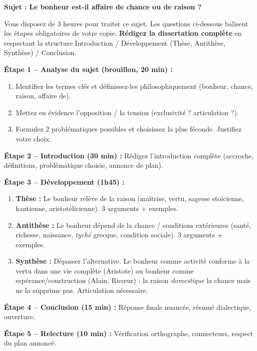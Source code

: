 \documentclass[11pt]{article}
\newcommand{\cle}[1]{{\popxbold\color{popdark}#1}}
\newcounter{popsec}
\newcounter{popsub}
\newcommand{\courssub}[1]{%
  \stepcounter{popsub}%
  \par\vspace{9pt}\noindent{\popxbold\fontsize{11.5}{13}\selectfont\color{popink}{\color{poporange}\thepopsec.\thepopsub}\hspace{6pt}#1}\par\nopagebreak\vspace{4pt}
}
\begin{document}
\courssub{Je me prépare au Bac}

\begin{exercice}
\textbf{Sujet :} \og \textbf{Le bonheur est-il affaire de chance ou de raison ?} \fg{}

Vous disposez de 3 heures pour traiter ce sujet. Les questions ci-dessous balisent les étapes obligatoires de votre copie. \textbf{Rédigez la dissertation complète} en respectant la structure Introduction / Développement (Thèse, Antithèse, Synthèse) / Conclusion.

\textbf{Étape 1 -- Analyse du sujet (brouillon, 20 min) :}
\begin{enumerate}
\item Identifiez les termes clés et définissez-les philosophiquement (bonheur, chance, raison, affaire de).
\item Mettez en évidence l'opposition / la tension (exclusivité ? articulation ?).
\item Formulez 2 problématiques possibles et choisissez la plus féconde. Justifiez votre choix.
\end{enumerate}

\textbf{Étape 2 -- Introduction (30 min) :}
Rédigez l'introduction complète (accroche, définitions, problématique choisie, annonce de plan).

\textbf{Étape 3 -- Développement (1h45) :}
\begin{enumerate}
\item \textbf{Thèse :} Le bonheur relève de la raison (maîtrise, vertu, sagesse stoïcienne, kantienne, aristotélicienne). 3 arguments + exemples.
\item \textbf{Antithèse :} Le bonheur dépend de la chance / conditions extérieures (santé, richesse, naissance, \emph{tyché} grecque, condition sociale). 3 arguments + exemples.
\item \textbf{Synthèse :} Dépasser l'alternative. Le bonheur comme \cle{activité conforme à la vertu dans une vie complète} (Aristote) ou \cle{bonheur comme espérance/construction} (Alain, Ricœur) : la raison \emph{domestique} la chance mais ne la supprime pas. Articulation nécessaire.
\end{enumerate}

\textbf{Étape 4 -- Conclusion (15 min) :}
Réponse finale nuancée, résumé dialectique, ouverture.

\textbf{Étape 5 -- Relecture (10 min) :}
Vérification orthographe, connecteurs, respect du plan annoncé.
\end{exercice}
\end{document}
